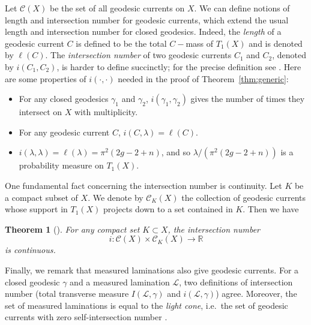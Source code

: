 \documentclass[11pt]{article} %
\theoremstyle{plain}
\newtheorem{thm}{Theorem}[section]
\theoremstyle{definition}
\numberwithin{equation}{section}
\begin{document}
Let $\mathcal{C}(X)$ be the set of all geodesic currents on $X$. We can define notions of length and intersection number for geodesic currents, which extend the usual length and intersection number for closed geodesics. Indeed, the \emph{length} of a geodesic current $C$ is defined to be the total $C-$mass of $T_1(X)$ and is denoted by $\ell(C)$. The \emph{intersection number} of two geodesic currents $C_1$ and $C_2$, denoted by $i(C_1,C_2)$, is harder to define succinctly; for the precise definition see \cite{Bon.gc}. Here are some properties of $i(\cdot,\cdot)$ needed in the proof of Theorem~\ref{thm:generic}:
\begin{itemize}[topsep=0mm, itemsep=0mm]
    \item For any closed geodesics $\gamma_1$ and $\gamma_2$, $i(\gamma_1,\gamma_2)$ gives the number of times they intersect on $X$ with multiplicity.
    \item For any geodesic current $C$, $i(C,\lambda)=\ell(C)$.
    \item $i(\lambda,\lambda)=\ell(\lambda)=\pi^2(2g-2+n)$, and so $\lambda/(\pi^2(2g-2+n))$ is a probability measure on $T_1(X)$.
\end{itemize}

One fundamental fact concerning the intersection number is continuity. Let $K$ be a compact subset of $X$. We denote by $\mathcal{C}_K(X)$ the collection of geodesic currents whose support in $T_1(X)$ projects down to a set contained in $K$. Then we have \cite[\S4.2]{Bon.gc}
\begin{thm}[\cite{Bon.gc}]
For any compact set $K\subset X$, the intersection number
$$i:\mathcal{C}(X)\times\mathcal{C}_K(X)\to\mathbb{R}$$
is continuous.
\end{thm}

Finally, we remark that measured laminations also give geodesic currents. For a closed geodesic $\gamma$ and a measured lamination $\mathcal{L}$, two definitions of intersection number (total transverse measure $I(\mathcal{L},\gamma)$ and $i(\mathcal{L},\gamma)$) agree. Moreover, the set of measured laminations is equal to the \emph{light cone}, i.e.\ the set of geodesic currents with zero self-intersection number \cite[Prop 4.8]{Bon.gc}.
\end{document}
